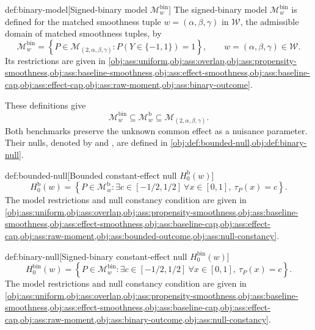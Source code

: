 \begin{definitionv}{def:binary-model}[Signed-binary model $\mathcal M^{\mathrm{bin}}_w$]
The signed-binary model \(\mathcal M^{\mathrm{bin}}_w\) is defined for the matched smoothness tuple \(w=(\alpha,\beta,\gamma)\) in \(\mathcal W\), the admissible domain of matched smoothness tuples, by
\[
\mathcal M^{\mathrm{bin}}_w
=
\left\{
P\in\mathcal M_{(2,\alpha,\beta,\gamma)}:
P(Y\in\{-1,1\})=1
\right\},
\qquad
w=(\alpha,\beta,\gamma)\in\mathcal W.
\]
Its restrictions are given in \cref{obj:ass:uniform,obj:ass:overlap,obj:ass:propensity-smoothness,obj:ass:baseline-smoothness,obj:ass:effect-smoothness,obj:ass:baseline-cap,obj:ass:effect-cap,obj:ass:raw-moment,obj:ass:binary-outcome}.
\end{definitionv}

These definitions give
\[
\mathcal M^{\mathrm{bin}}_w
\subseteq
\mathcal M^{\mathrm b}_w
\subseteq
\mathcal M_{(2,\alpha,\beta,\gamma)}.
\]
Both benchmarks preserve the unknown common effect as a nuisance parameter. Their nulls, denoted by  and , are defined in \cref{obj:def:bounded-null,obj:def:binary-null}.

\begin{definitionv}{def:bounded-null}[Bounded constant-effect null $H_0^{\mathrm b}(w)$]
\[
H_0^{\mathrm b}(w)
=
\left\{
P\in\mathcal M^{\mathrm b}_w:
\exists c\in[-1/2,1/2]\ 
\forall x\in[0,1],\ \tau_P(x)=c
\right\}.
\]
The model restrictions and null constancy condition are given in \cref{obj:ass:uniform,obj:ass:overlap,obj:ass:propensity-smoothness,obj:ass:baseline-smoothness,obj:ass:effect-smoothness,obj:ass:baseline-cap,obj:ass:effect-cap,obj:ass:raw-moment,obj:ass:bounded-outcome,obj:ass:null-constancy}.
\end{definitionv}

\begin{definitionv}{def:binary-null}[Signed-binary constant-effect null $H_0^{\mathrm{bin}}(w)$]
\[
H_0^{\mathrm{bin}}(w)
=
\left\{
P\in\mathcal M^{\mathrm{bin}}_w:
\exists c\in[-1/2,1/2]\ 
\forall x\in[0,1],\ \tau_P(x)=c
\right\}.
\]
The model restrictions and null constancy condition are given in \cref{obj:ass:uniform,obj:ass:overlap,obj:ass:propensity-smoothness,obj:ass:baseline-smoothness,obj:ass:effect-smoothness,obj:ass:baseline-cap,obj:ass:effect-cap,obj:ass:raw-moment,obj:ass:binary-outcome,obj:ass:null-constancy}.
\end{definitionv}

